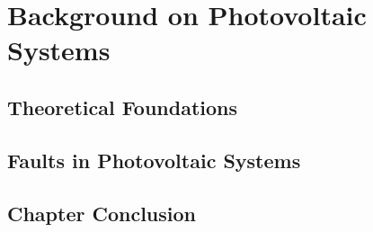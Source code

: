 \chapter{Background on Photovoltaic Systems}
\label{ch:pv-systems}

\section{Theoretical Foundations}
\label{sec:pv-theory}


\section{Faults in Photovoltaic Systems}
\label{sec:pv-faults}


\section*{Chapter Conclusion}
